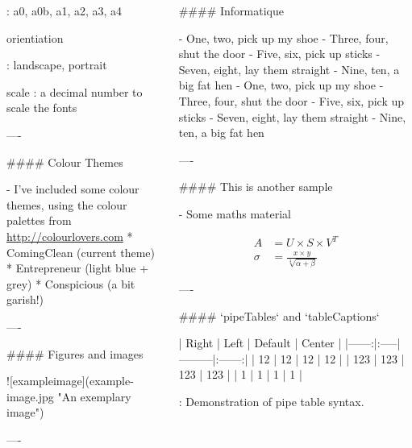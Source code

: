 \documentclass{beamer}
\begin{document}
\begin{frame}[fragile]
\begin{columns}[T]
\begin{column}{.46\textwidth}
\begin{markdown}
    :   a0, a0b, a1, a2, a3, a4

    orientiation
    
    :   landscape, portrait
    
    scale
    :   a decimal number to scale the fonts

----

#### Colour Themes

- I've included some colour themes, using the colour palettes from \url{http://colourlovers.com}
    * ComingClean (current theme)
    * Entrepreneur (light blue + grey)
    * Conspicious (a bit garish!)

---- 

#### Figures and images


![exampleimage](example-image.jpg "An exemplary image")

----

\end{markdown}

\end{column}

\begin{column}{.46\textwidth}

\begin{markdown}

#### Informatique

- One, two, pick up my shoe
- Three, four, shut the door
- Five, six, pick up sticks
- Seven, eight, lay them straight
- Nine, ten, a big fat hen
- One, two, pick up my shoe
- Three, four, shut the door
- Five, six, pick up sticks
- Seven, eight, lay them straight
- Nine, ten, a big fat hen

----

#### This is another sample

- Some maths material

\begin{align}
A &= U \times S \times V^T\\
\sigma &= \frac{x\times y}{\sqrt[3]{\alpha + \beta}}
\end{align}

----


#### `pipeTables` and `tableCaptions`

| Right | Left | Default | Center |
|------:|:-----|---------|:------:| 
|  12   |  12  |  12     |   12   | 
| 123   |  123 |   123   |  123   | 
|   1   |    1 |     1   |    1   | 

  : Demonstration of pipe table syntax.


\end{markdown}
\end{column}
\end{columns}
\end{frame}
\end{document}
